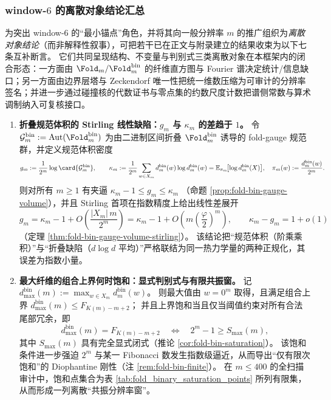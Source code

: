 \subsubsection{window-\texorpdfstring{\(6\)}{6} 的离散对象结论汇总}\label{subsubsec:window6-discrete-results}
为突出 window-\(6\) 的“最小锚点”角色，并将其向一般分辨率 \(m\) 的推广组织为\emph{离散对象结论}（而非解释性叙事），可把若干已在正文与附录建立的结果收束为以下七条互补断言。
它们共同呈现结构、不变量与判别式三类离散对象在本框架内的闭合形态：一方面由 \(\Fold_m/\Fold^{\mathrm{bin}}_m\) 的纤维直方图与 Fourier 谱决定统计/信息缺口；另一方面由边界层塔与 Zeckendorf 唯一性把统一维数压缩为可审计的分辨率签名；并进一步通过碰撞核的代数证书与零点集的约数尺度计数把谱侧常数与算术调制纳入可复核接口。

\begin{enumerate}
  \item \textbf{折叠规范体积的 Stirling 线性缺陷：\texorpdfstring{$g_m$}{gm} 与 \texorpdfstring{$\kappa_m$}{kappa} 的差趋于 \(1\)。}
  令
  \(\mathcal{G}^{\mathrm{bin}}_m:=\mathrm{Aut}(\Fold^{\mathrm{bin}}_m)\)
  为由二进制区间折叠 \(\Fold^{\mathrm{bin}}_m\) 诱导的 fold-gauge 规范群，并定义规范体积密度
  \[
  g_m:=\frac{1}{2^m}\log\card{\mathcal{G}^{\mathrm{bin}}_m},
  \qquad
  \kappa_m
  :=\frac{1}{2^m}\sum_{w\in X_m}d^{\mathrm{bin}}_m(w)\log d^{\mathrm{bin}}_m(w)
  =\mathbb{E}_{\pi_m}\!\bigl[\log d^{\mathrm{bin}}_m(X)\bigr],
  \quad
  \pi_m(w):=\frac{d^{\mathrm{bin}}_m(w)}{2^m}.
  \]
  则对所有 \(m\ge 1\) 有夹逼
  \(
  \kappa_m-1\le g_m\le \kappa_m
  \)
  （命题 \ref{prop:fold-bin-gauge-volume}），并且 Stirling 首项在指数精度上给出线性差展开
  \[
  g_m=\kappa_m-1+O\!\left(\frac{|X_m|\,m}{2^m}\right)
  =\kappa_m-1+O\!\left(m\left(\frac{\varphi}{2}\right)^m\right),
  \qquad
  \kappa_m-g_m=1+o(1)
  \]
  （定理 \ref{thm:fold-bin-gauge-volume-stirling}）。
  该结论把“规范体积（阶乘乘积）”与“折叠缺陷（\(d\log d\) 平均）”严格联结为同一热力学量的两种正规化，其误差为指数小量。

  \item \textbf{最大纤维的组合上界何时饱和：显式判别式与有限共振窗。}
  记
  \(d^{\mathrm{bin}}_{\max}(m):=\max_{w\in X_m}d^{\mathrm{bin}}_m(w)\)。
  则最大值由 \(w=0^m\) 取得，且满足组合上界
  \(d^{\mathrm{bin}}_{\max}(m)\le F_{K(m)-m+2}\)；
  并且上界饱和当且仅当阈值约束对所有合法尾部冗余，即
  \[
  d^{\mathrm{bin}}_{\max}(m)=F_{K(m)-m+2}
  \quad\Longleftrightarrow\quad
  2^m-1\ge S_{\max}(m),
  \]
  其中 \(S_{\max}(m)\) 具有完全显式闭式（推论 \ref{cor:fold-bin-saturation}）。
  该饱和条件进一步强迫 \(2^m\) 与某一 Fibonacci 数发生指数级逼近，从而导出“仅有限次饱和”的 Diophantine 刚性（注 \ref{rem:fold-bin-finite}）。
  在 \(m\le 400\) 的全扫描审计中，饱和点集合为表 \ref{tab:fold_binary_saturation_points} 所列有限集，从而形成一列离散“共振分辨率窗”。


\end{enumerate}
